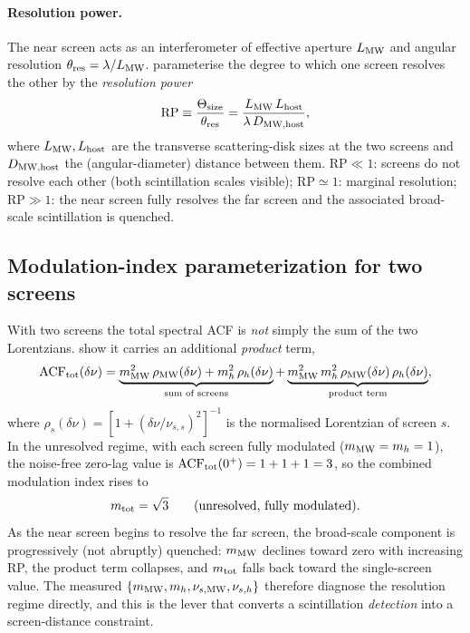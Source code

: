 \paragraph{Resolution power.}
The near screen acts as an interferometer of effective aperture
$L_{\rm MW}$ and angular resolution $\theta_{\rm res}=\lambda/L_{\rm MW}$.
\citet{Pradeep2025} parameterise the degree to which one screen resolves
the other by the \emph{resolution power}
%
\begin{equation}
\mathrm{RP} \equiv \frac{\Theta_{\rm size}}{\theta_{\rm res}}
  = \frac{L_{\rm MW}\,L_{\rm host}}{\lambda\,D_{\rm MW,host}},
\label{eq:rp}
\end{equation}
%
where $L_{\rm MW},L_{\rm host}$ are the transverse scattering-disk sizes at
the two screens and $D_{\rm MW,host}$ the (angular-diameter) distance
between them. $\mathrm{RP}\ll1$: screens do not resolve each other (both
scintillation scales visible); $\mathrm{RP}\simeq1$: marginal resolution;
$\mathrm{RP}\gg1$: the near screen fully resolves the far screen and the
associated broad-scale scintillation is quenched.


\subsection{Modulation-index parameterization for two screens}
\label{sec:modindex}

With two screens the total spectral ACF is \emph{not} simply the sum of the
two Lorentzians. \citet{Pradeep2025} show it carries an additional
\emph{product} term,
%
\begin{equation}
\mathrm{ACF}_{\rm tot}(\delta\nu)
  = \underbrace{m_{\rm MW}^{2}\,\rho_{\rm MW}(\delta\nu)
  + m_{h}^{2}\,\rho_{h}(\delta\nu)}_{\text{sum of screens}}
  + \underbrace{m_{\rm MW}^{2}\,m_{h}^{2}\,
      \rho_{\rm MW}(\delta\nu)\,\rho_{h}(\delta\nu)}_{\text{product term}},
\label{eq:acf2}
\end{equation}
%
where $\rho_{s}(\delta\nu)=[1+(\delta\nu/\nu_{s,s})^{2}]^{-1}$ is the
normalised Lorentzian of screen $s$. In the unresolved regime, with each
screen fully modulated ($m_{\rm MW}=m_{h}=1$), the noise-free zero-lag value
is $\mathrm{ACF}_{\rm tot}(0^{+})=1+1+1=3$, so the combined modulation index
rises to
%
\begin{equation}
m_{\rm tot} = \sqrt{3}\qquad(\text{unresolved, fully modulated}).
\label{eq:sqrt3}
\end{equation}
%
As the near screen begins to resolve the far screen, the broad-scale
component is progressively (not abruptly) quenched: $m_{\rm MW}$ declines
toward zero with increasing RP, the product term collapses, and
$m_{\rm tot}$ falls back toward the single-screen value. The measured
$\{m_{\rm MW},m_{h},\nu_{s,\rm MW},\nu_{s,h}\}$ therefore diagnose the
resolution regime directly, and this is the lever that converts a
scintillation \emph{detection} into a screen-distance constraint.



